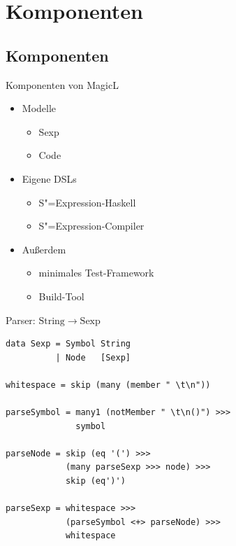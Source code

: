 \documentclass{beamer}
\newcommand\ato{\rightarrow} %
\newcommand{\sexp}{S"=Expression}
\begin{document}
\section{Komponenten}
\subsection{Komponenten}

\begin{frame}{Komponenten von MagicL}
  \begin{itemize}
  \item Modelle
    \begin{itemize}
    \item Sexp
    \item Code
    \end{itemize}
  \item Eigene DSLs
    \begin{itemize}
    \item \sexp{}-Haskell
    \item \sexp{}-Compiler
    \end{itemize}
  \item Außerdem
    \begin{itemize}
    \item minimales Test-Framework
    \item Build-Tool
    \end{itemize}
  \end{itemize}
\end{frame}

\begin{frame}[fragile]{Parser: $\mathrm{String} \ato \mathrm{Sexp}$}
\begin{verbatim}
data Sexp = Symbol String
          | Node   [Sexp]

whitespace = skip (many (member " \t\n"))

parseSymbol = many1 (notMember " \t\n()") >>>
              symbol

parseNode = skip (eq '(') >>> 
            (many parseSexp >>> node) >>> 
            skip (eq')')

parseSexp = whitespace >>> 
            (parseSymbol <+> parseNode) >>> 
            whitespace
\end{verbatim}
\end{frame}
\end{document}
